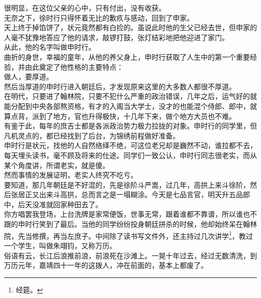 \begin{multicols}{\theparacolNo}
很明显，在这位父亲的心中，只有付出，没有收获。\\

无奈之下，徐时行只得怀着无比的歉疚与感动，回到了申家。\\

天上终于掉馅饼了，状元竟然都有白捡的。虽说此时他的生父已经去世，但申家的人毫不犹豫地答应了他的请求，敲锣打鼓，张灯结彩地把他迎进了家门。\\

从此，他的名字叫做申时行。\\

曲折的身世，幸福的童年，从他的养父身上，申时行获取了人生中的第一个重要经验，并由此奠定了他性格的主要特点：\\

做人，要厚道。\\

然后当厚道的申时行进入朝廷后，才发现原来这里的大多数人都很不厚道。\\

在明代，只要进了翰林院，只要不犯什么严重的政治错误，几年之后，运气好的就能分配到中央各部熬资格，有才的入阁当大学士，没才的也能混个侍郎、郎中，就算点背，派到了地方，官也升得极快，十几年下来，做个地方大员也不难。\\

有鉴于此，每年的庶吉士都是各派政治势力极力拉拢的对象。申时行的同学里，但凡机灵点的，都已经找到了后台，为锦绣前程做好准备。\\

申时行是状元，找他的人自然络绎不绝，可这位老兄却是巍然不动，谁拉都不去，每天埋头读书，毫不顾及将来的仕途。同学们一致公认，申时行同志很老实，而从某个角度讲，所谓老实，就是傻。\\

然而事情的发展证明，老实人终究不吃亏。\\

要知道，那几年朝廷是不好混的，先是徐阶斗严嵩，过几年，高拱上来斗徐阶，然后张居正又出来斗高拱，总而言之是一塌糊涂。今天是七品言官，明天升五品郎中，后天没准就回家种田去了。\\

你方唱罢我登场，上台洗牌是家常便饭，世事无常，跟着谁都不靠谱，所以谁也不跟的申时行笑到了最后。当他的同学纷纷投身朝廷拼杀的时候，他却始终呆在翰林院，先当修撰，再当左庶子。中间除了读书写文件外，还主持过几次讲学\footnote{经筵。}，教过一个学生，叫做朱翊钧，又称万历。\\

俗语有云，长江后浪推前浪，前浪死在沙滩上。一晃十年过去，经过无数清洗，到万历元年，嘉靖四十一年的这拨人，冲在前面的，基本上都废了。\\


\end{multicols}
